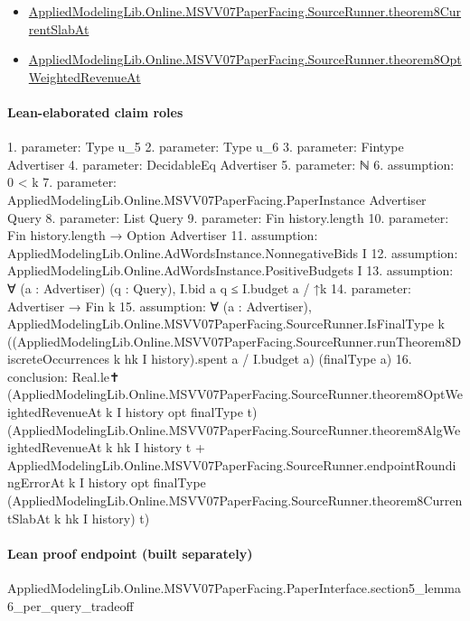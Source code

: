 \documentclass[10pt]{article}
\begin{document}
\begin{itemize}
\item \hyperlink{governing-declaration-7cc47e6ea353e743}{Applied\allowbreak{}Modeling\allowbreak{}Lib.\allowbreak{}Online.\allowbreak{}MSVV07\allowbreak{}Paper\allowbreak{}Facing.\allowbreak{}Source\allowbreak{}Runner.\allowbreak{}theorem8\allowbreak{}Current\allowbreak{}Slab\allowbreak{}At}
\item \hyperlink{governing-declaration-d6fc40d3169dd8b8}{Applied\allowbreak{}Modeling\allowbreak{}Lib.\allowbreak{}Online.\allowbreak{}MSVV07\allowbreak{}Paper\allowbreak{}Facing.\allowbreak{}Source\allowbreak{}Runner.\allowbreak{}theorem8\allowbreak{}Opt\allowbreak{}Weighted\allowbreak{}Revenue\allowbreak{}At}
\end{itemize}
\paragraph{Lean-elaborated claim roles}\begin{ReviewVerbatim}
1. parameter: Type u_5
2. parameter: Type u_6
3. parameter: Fintype Advertiser
4. parameter: DecidableEq Advertiser
5. parameter: ℕ
6. assumption: 0 < k
7. parameter: AppliedModelingLib.Online.MSVV07PaperFacing.PaperInstance Advertiser Query
8. parameter: List Query
9. parameter: Fin history.length
10. parameter: Fin history.length → Option Advertiser
11. assumption: AppliedModelingLib.Online.AdWordsInstance.NonnegativeBids I
12. assumption: AppliedModelingLib.Online.AdWordsInstance.PositiveBudgets I
13. assumption: ∀ (a : Advertiser) (q : Query), I.bid a q ≤ I.budget a / ↑k
14. parameter: Advertiser → Fin k
15. assumption: ∀ (a : Advertiser),
  AppliedModelingLib.Online.MSVV07PaperFacing.SourceRunner.IsFinalType k
    ((AppliedModelingLib.Online.MSVV07PaperFacing.SourceRunner.runTheorem8DiscreteOccurrences k hk I history).spent a /
      I.budget a)
    (finalType a)
16. conclusion: Real.le✝
  (AppliedModelingLib.Online.MSVV07PaperFacing.SourceRunner.theorem8OptWeightedRevenueAt k I history opt finalType t)
  (AppliedModelingLib.Online.MSVV07PaperFacing.SourceRunner.theorem8AlgWeightedRevenueAt k hk I history t +
    AppliedModelingLib.Online.MSVV07PaperFacing.SourceRunner.endpointRoundingErrorAt k I history opt finalType
      (AppliedModelingLib.Online.MSVV07PaperFacing.SourceRunner.theorem8CurrentSlabAt k hk I history) t)
\end{ReviewVerbatim}

\paragraph{Lean proof endpoint (built separately)}\begin{ReviewVerbatim}
AppliedModelingLib.Online.MSVV07PaperFacing.PaperInterface.section5_lemma6_per_query_tradeoff
\end{ReviewVerbatim}
\end{document}
